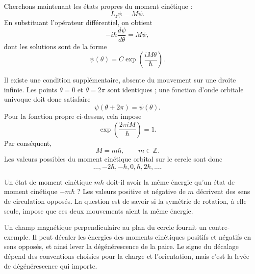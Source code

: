 Cherchons maintenant les états propres du moment cinétique :
\begin{equation}
L_z\psi=M\psi.
\end{equation}
En substituant l’opérateur différentiel, on obtient
\begin{equation}
-i\hbar\frac{d\psi}{d\theta}=M\psi,
\end{equation}
dont les solutions sont de la forme
\begin{equation}
\psi(\theta)=C\exp\left(\frac{iM\theta}{\hbar}\right).
\end{equation}

Il existe une condition supplémentaire, absente du mouvement sur une droite infinie. Les points \(\theta=0\) et \(\theta=2\pi\) sont identiques ; une fonction d’onde orbitale univoque doit donc satisfaire
\begin{equation}
\psi(\theta+2\pi)=\psi(\theta).
\end{equation}
Pour la fonction propre ci-dessus, cela impose
\begin{equation}
\exp\left(\frac{2\pi iM}{\hbar}\right)=1.
\end{equation}
Par conséquent,
\begin{equation}
M=m\hbar,
\qquad
m\in\mathbb Z.
\end{equation}
Les valeurs possibles du moment cinétique orbital sur le cercle sont donc
\begin{equation}
\ldots,-2\hbar,-\hbar,0,\hbar,2\hbar,\ldots.
\end{equation}

Un état de moment cinétique \(m\hbar\) doit-il avoir la même énergie qu’un état de moment cinétique \(-m\hbar\) ? Les valeurs positive et négative de \(m\) décrivent des sens de circulation opposés. La question est de savoir si la symétrie de rotation, à elle seule, impose que ces deux mouvements aient la même énergie.

\begin{classroomqa}
\end{classroomqa}

Un champ magnétique perpendiculaire au plan du cercle fournit un contre-exemple. Il peut décaler les énergies des moments cinétiques positifs et négatifs en sens opposés, et ainsi lever la dégénérescence de la paire. Le signe du décalage dépend des conventions choisies pour la charge et l’orientation, mais c’est la levée de dégénérescence qui importe.

